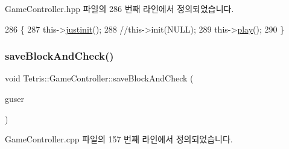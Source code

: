 Game\+Controller.\+hpp 파일의 286 번째 라인에서 정의되었습니다.


\begin{DoxyCode}
286                       \{
287                 this->\hyperlink{class_tetris_1_1_game_controller_aef406397d4719c9edd49774d0343ce05}{justinit}();
288                 \textcolor{comment}{//this->init(NULL);}
289                 this->\hyperlink{class_tetris_1_1_game_controller_a766a7537d955c62969f2e4b7c0b3c73d}{play}();
290             \}
\end{DoxyCode}
\mbox{\label{class_tetris_1_1_game_controller_a3c63a9754e4cbeae4f66a5760bb4055d}} 
\subsubsection{\texorpdfstring{save\+Block\+And\+Check()}{saveBlockAndCheck()}\hspace{0.1cm}{\footnotesize\ttfamily [1/2]}}
{\footnotesize\ttfamily void Tetris\+::\+Game\+Controller\+::save\+Block\+And\+Check (\begin{DoxyParamCaption}\item[{\hyperlink{class_tetris_1_1_users_1_1_game_user}{Users\+::\+Game\+User} $\ast$}]{guser }\end{DoxyParamCaption})}



Game\+Controller.\+cpp 파일의 157 번째 라인에서 정의되었습니다.


